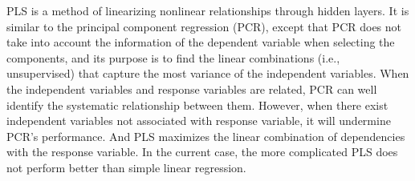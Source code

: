 \documentclass[12pt,]{krantz}
\newenvironment{Shaded}{\begin{snugshade}}{\end{snugshade}}
\newcommand{\KeywordTok}[1]{\textcolor[rgb]{0.13,0.29,0.53}{\textbf{#1}}}
\newcommand{\DataTypeTok}[1]{\textcolor[rgb]{0.13,0.29,0.53}{#1}}
\newcommand{\DecValTok}[1]{\textcolor[rgb]{0.00,0.00,0.81}{#1}}
\newcommand{\StringTok}[1]{\textcolor[rgb]{0.31,0.60,0.02}{#1}}
\newcommand{\CommentTok}[1]{\textcolor[rgb]{0.56,0.35,0.01}{\textit{#1}}}
\newcommand{\OtherTok}[1]{\textcolor[rgb]{0.56,0.35,0.01}{#1}}
\newcommand{\ControlFlowTok}[1]{\textcolor[rgb]{0.13,0.29,0.53}{\textbf{#1}}}
\newcommand{\OperatorTok}[1]{\textcolor[rgb]{0.81,0.36,0.00}{\textbf{#1}}}
\newcommand{\NormalTok}[1]{#1}
\theoremstyle{definition}
\theoremstyle{definition}
\theoremstyle{definition}
\theoremstyle{remark}
\begin{document}
PLS is a method of linearizing nonlinear relationships through hidden
layers. It is similar to the principal component regression (PCR),
except that PCR does not take into account the information of the
dependent variable when selecting the components, and its purpose is to
find the linear combinations (i.e., unsupervised) that capture the most
variance of the independent variables. When the independent variables
and response variables are related, PCR can well identify the systematic
relationship between them. However, when there exist independent
variables not associated with response variable, it will undermine PCR's
performance. And PLS maximizes the linear combination of dependencies
with the response variable. In the current case, the more complicated
PLS does not perform better than simple linear regression.

\begin{Shaded}
\end{Shaded}
\end{document}
